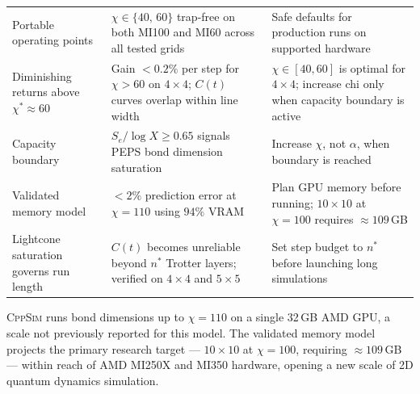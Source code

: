 \documentclass[11pt]{article}
\begin{document}
\begin{table}[ht]
{\begin{tabular}{p{3.6cm} p{4.2cm} p{4.6cm}}
Portable operating points
  & $\chi \in \{40,\,60\}$ trap-free on both MI100 and MI60 across all tested grids
  & Safe defaults for production runs on supported hardware \\[4pt]

Diminishing returns above $\chi^{*} \approx 60$
  & Gain ${<}0.2\%$ per step for $\chi > 60$ on $4{\times}4$; $C(t)$ curves overlap within line width
  & $\chi \in [40,60]$ is optimal for $4{\times}4$; increase chi only when capacity boundary is active \\[4pt]

Capacity boundary
  & $S_e / \log X \geq 0.65$ signals PEPS bond dimension saturation
  & Increase $\chi$, not $\alpha$, when boundary is reached \\[4pt]

Validated memory model
  & ${<}2\%$ prediction error at $\chi=110$ using $94\%$ VRAM
  & Plan GPU memory before running; $10{\times}10$ at $\chi=100$ requires ${\approx}109$\,GB \\[4pt]

Lightcone saturation governs run length
  & $C(t)$ becomes unreliable beyond $n^{*}$ Trotter layers; verified on $4{\times}4$ and $5{\times}5$
  & Set step budget to $n^{*}$ before launching long simulations \\
\bottomrule
\end{tabular}}
\end{table}

\textsc{CppSim} runs bond dimensions up to $\chi=110$ on a single 32\,GB AMD GPU,
a scale not previously reported for this model.
The validated memory model projects the primary research target ---
$10\times10$ at $\chi=100$, requiring $\approx109$\,GB --- within reach of
AMD MI250X and MI350 hardware, opening a new scale of 2D quantum dynamics simulation.
\end{document}
